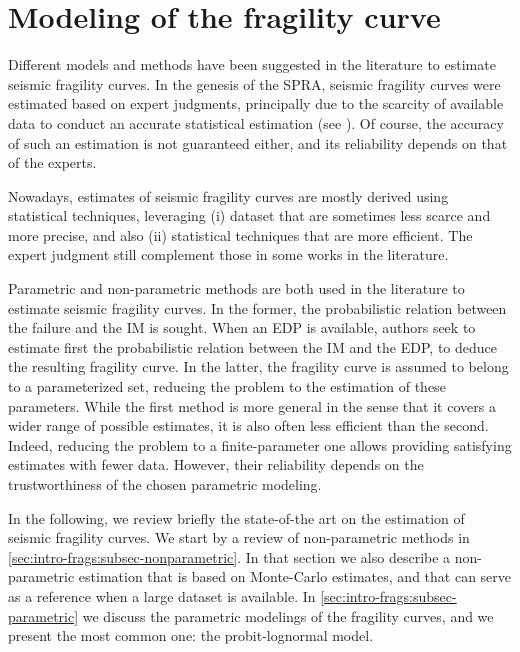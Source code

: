 







\section{Modeling of the fragility curve}\label{sec:intro-frags:models}

Different models and methods have been suggested in the literature to estimate seismic fragility curves.
In the genesis of the SPRA, seismic fragility curves were estimated based on expert judgments, principally due to the scarcity of available data to conduct an accurate statistical estimation (see \cite{kennedy_probabilistic_1980}).
Of course, the accuracy of such an estimation is not guaranteed either, and its reliability depends on that of the experts.

Nowadays, estimates of seismic fragility curves are mostly derived using statistical techniques, leveraging (i) dataset that are sometimes less scarce and more precise, and also (ii) statistical techniques that are more efficient. 
The expert judgment still complement those in some works in the literature.


Parametric and non-parametric methods are both used in the literature to estimate seismic fragility curves.
In the former, the probabilistic relation between the failure and the IM is sought. When an EDP is available, authors seek to estimate first the probabilistic relation between the IM and the EDP, to deduce the resulting fragility curve.
In the latter, the fragility curve is assumed to belong to a parameterized set, reducing the problem to the estimation of these parameters.
While the first method is more general in the sense that it covers a wider range of possible estimates, it is also often less efficient than the second. Indeed, reducing the problem to a finite-parameter one allows providing satisfying estimates with fewer data. However, their reliability depends on the trustworthiness of the chosen parametric modeling.

In the following, we review briefly the
state-of-the art on the estimation of seismic fragility curves. We start by a review of non-parametric methods in \cref{sec:intro-frags:subsec-nonparametric}. In that section we also describe a non-parametric estimation that is based on Monte-Carlo estimates, and that can serve as a reference when a large dataset is available.
In \cref{sec:intro-frags:subsec-parametric} we discuss the parametric modelings of the fragility curves, and we present the most common one: the probit-lognormal model.



